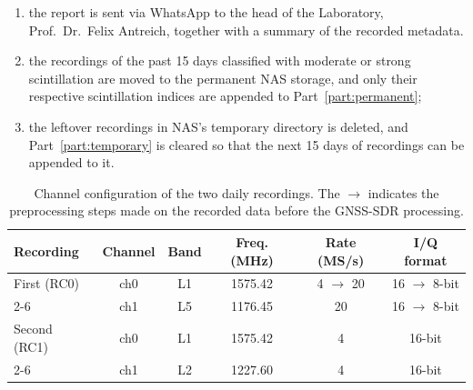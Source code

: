 \documentclass{article}
\begin{document}
\begin{itemize}
    \begin{enumerate}
        \item the report is sent via WhatsApp to the head of the Laboratory, Prof.\ Dr.\ Felix Antreich, together with a summary of the recorded metadata.
        \item the recordings of the past 15 days classified with moderate or strong scintillation are moved to the permanent NAS storage, and only their respective scintillation indices are appended to Part~\ref{part:permanent};
        \item the leftover recordings in NAS's temporary directory is deleted, and Part~\ref{part:temporary} is cleared so that the next 15 days of recordings can be appended to it.
    \end{enumerate}
\end{itemize}

\begin{table}[H]
      \centering
      \caption{Channel configuration of the two daily recordings. The $\rightarrow$ indicates the preprocessing steps made on the recorded data before the GNSS-SDR processing.}
      \label{tab:recording-profiles}
      \small\setlength{\tabcolsep}{4pt}
      \begin{tabular}{|l|c|c|c|c|c|}
        \hline
        \textbf{Recording} & \textbf{Channel}\footnotemark & \textbf{Band} & \textbf{Freq. (MHz)} & \textbf{Rate (MS/s)} & \textbf{I/Q format} \\
        \hline
        First (RC0) & ch0 & L1 & 1575.42 & 4 $\rightarrow$ 20 & 16 $\rightarrow$ 8-bit \\
        \cline{2-6}
         & ch1 & L5 & 1176.45 & 20 & 16 $\rightarrow$ 8-bit \\
        \hline
        Second (RC1) & ch0 & L1 & 1575.42 & 4 & 16-bit \\
        \cline{2-6}
         & ch1 & L2 & 1227.60 & 4 & 16-bit \\
        \hline
      \end{tabular}
    \end{table}
\end{document}
